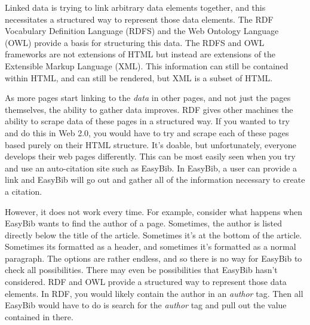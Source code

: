 \documentclass[12pt]{article}
\begin{document}
Linked data is trying to link arbitrary data elements together, and this necessitates a structured way to represent those data elements.  The RDF Vocabulary Definition Language (RDFS) and the Web Ontology Language (OWL) provide a basis for structuring this data.  The RDFS and OWL frameworks are not extensions of HTML but instead are extensions of the Extensible Markup Language (XML).  This information can still be contained within HTML, and can still be rendered, but XML is a subset of HTML\cite{heath_global_data}.

As more pages start linking to the \textit{data} in other pages, and not just the pages themselves, the ability to gather data improves. RDF gives other machines the ability to scrape data of these pages in a structured way.  If you wanted to try and do this in Web 2.0, you would have to try and scrape each of these pages based purely on their HTML structure.  It's doable, but unfortunately, everyone develops their web pages differently.  This can be most easily seen when you try and use an auto-citation site such as EasyBib. In EasyBib, a user can provide a link and EasyBib will go out and gather all of the information necessary to create a citation.

However, it does not work every time. For example, consider what happens when EasyBib wants to find the author of a page.  Sometimes, the author is listed directly below the title of the article.  Sometimes it's at the bottom of the article.   Sometimes its formatted as a header, and sometimes it's formatted as a normal paragraph.  The options are rather endless, and so there is no way for EasyBib to check all possibilities.  There may even be possibilities that EasyBib hasn't considered.  RDF and OWL provide a structured way to represent those data elements.  In RDF, you would likely contain the author in an \textit{author} tag.  Then all EasyBib would have to do is search for the \textit{author} tag and pull out the value contained in there.
\end{document}

